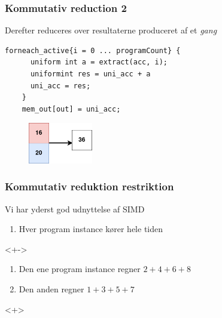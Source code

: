 \documentclass[t]{beamer}
\begin{document}
\begin{frame}[fragile]
  \frametitle{Kommutativ reduction 2}
  Derefter reduceres over resultaterne produceret af et \textit{gang}
  \begin{lstlisting}[language=ispc]
    forneach_active{i = 0 ... programCount} {
      uniform int a = extract(acc, i);
      uniformint res = uni_acc + a
      uni_acc = res;
    }
    mem_out[out] = uni_acc;
\end{lstlisting}
  \begin{figure}[H]
    \centering
    \includegraphics[width=0.25\textwidth]{imgs/kom_reduce2.png}
  \end{figure}
\end{frame}

\begin{frame}
  \frametitle{Kommutativ reduktion restriktion}
  Vi har yderst god udnyttelse af SIMD
  \begin{enumerate}
    \item<+-> Hver program instance kører hele tiden
  \end{enumerate}
  <+->
  \begin{enumerate}
    \item<+-> Den ene program instance regner $2+4+6+8$
    \item<+-> Den anden regner $1+3+5+7$
  \end{enumerate}
  <+>
\end{frame}
\end{document}
